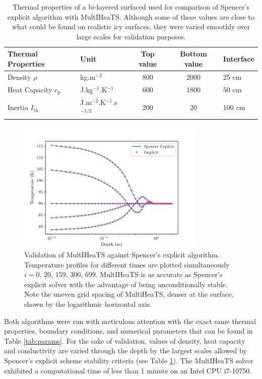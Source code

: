 \documentclass[sn-vancouver, Numbered]{sn-jnl}
\begin{document}
\begin{table}[htbp]
    \centering
    \begin{tabular}{ l l c c l } 
     \toprule
     Thermal Properties & Unit & Top value & Bottom value & Interface \\ 
     \midrule
     Density $\rho$ & kg.m$^{-3}$ & 800 & 2000 & 25 cm \\ 
    Heat Capacity $c_{\mathrm{p}}$ & J.kg$^{-1}$.K$^{-1}$ & 600 & 1800 & 50 cm \\ 
    Inertia $I_{\mathrm{th}}$ & J.m$^{-2}$.K$^{-1}$.s$^{-1/2}$ & 200 & 20 & 100 cm \\ 
     \bottomrule
    \end{tabular}
\caption{Thermal properties of a bi-layered surfaced used for comparison of Spencer's explicit algorithm with MultIHeaTS. Although some of these values are close to what could be found on realistic icy surfaces, they were varied smoothly over large scales for validation purposes. }
\label{tab:thermal_ppties}
\end{table}

\begin{figure}[htpb]
	\centering
	\includegraphics[width=0.8\textwidth]{valid_spencer.pdf}
	\caption{Validation of MultIHeaTS against Spencer's explicit algorithm. Temperature profiles for different times are plotted simultaneously $i = 0$, $20$, $159$, $300$, $699$. MultIHeaTS is as accurate as Spencer's explicit solver with the advantage of being unconditionally stable. 
    Note the uneven grid spacing of MultiHeaTS, denser at the surface, shown by the logarithmic horizontal axis.
    }
    \label{fig:val_spencer}
\end{figure}


Both algorithms were run with meticulous attention with the exact same thermal properties, boundary conditions, and numerical parameters that can be found in Table \ref{tab:params}.
For the sake of validation, values of density, heat capacity and conductivity are varied through the depth by the largest scales allowed by Spencer's explicit scheme stability criteria (see Table \ref{tab:thermal_ppties}).
 The MultIHeaTS solver exhibited a computational time of less than 1 minute on an Intel CPU i7-10750.
\end{document}
